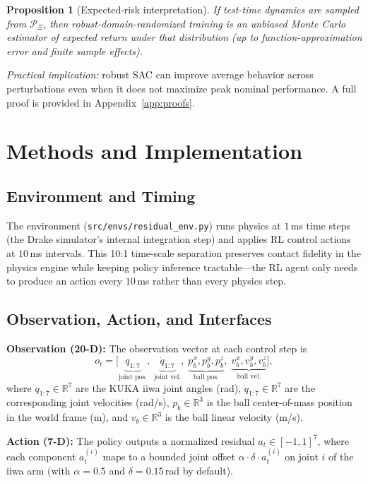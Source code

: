 \documentclass[10pt,twocolumn,letterpaper]{article}
\newtheorem{proposition}{Proposition}
\begin{document}
\begin{proposition}[Expected-risk interpretation]
\label{prop:expected_risk}
If test-time dynamics are sampled from $\mathcal{P}_\Xi$, then robust-domain-randomized training is an unbiased Monte Carlo estimator of expected return under that distribution (up to function-approximation error and finite sample effects).
\end{proposition}

\textit{Practical implication:}
robust SAC can improve average behavior across perturbations even when it does not maximize peak nominal performance. A full proof is provided in Appendix~\ref{app:proofs}.

\section{Methods and Implementation}
\subsection{Environment and Timing}
The environment (\texttt{src/envs/residual\_env.py}) runs physics at $1$\,ms time steps (the Drake simulator's internal integration step) and applies RL control actions at $10$\,ms intervals. This 10:1 time-scale separation preserves contact fidelity in the physics engine while keeping policy inference tractable---the RL agent only needs to produce an action every $10$\,ms rather than every physics step.

\subsection{Observation, Action, and Interfaces}
\textbf{Observation (20-D):}
The observation vector at each control step is
\[
o_t=\bigl[\underbrace{q_{1:7}}_{\text{joint pos.}},\;\underbrace{\dot{q}_{1:7}}_{\text{joint vel.}},\;\underbrace{p_b^x,p_b^y,p_b^z}_{\text{ball pos.}},\;\underbrace{v_b^x,v_b^y,v_b^z}_{\text{ball vel.}}\bigr],
\]
where $q_{1:7} \in \mathbb{R}^7$ are the KUKA iiwa joint angles (rad), $\dot{q}_{1:7} \in \mathbb{R}^7$ are the corresponding joint velocities (rad/s), $p_b \in \mathbb{R}^3$ is the ball center-of-mass position in the world frame (m), and $v_b \in \mathbb{R}^3$ is the ball linear velocity (m/s).

\textbf{Action (7-D):}
The policy outputs a normalized residual $a_t \in [-1,1]^7$, where each component $a_t^{(i)}$ maps to a bounded joint offset $\alpha \cdot \delta \cdot a_t^{(i)}$ on joint $i$ of the iiwa arm (with $\alpha = 0.5$ and $\delta = 0.15$\,rad by default).
\end{document}
